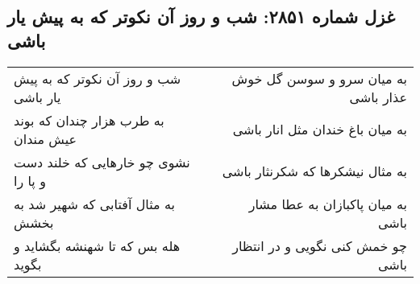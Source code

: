 \begin{center}
\section*{غزل شماره ۲۸۵۱: شب و روز آن نکوتر که به پیش یار باشی}
\label{sec:2851}
\begin{longtable}{l p{0.5cm} r}
شب و روز آن نکوتر که به پیش یار باشی
&&
به میان سرو و سوسن گل خوش عذار باشی
\\
به طرب هزار چندان که بوند عیش مندان
&&
به میان باغ خندان مثل انار باشی
\\
نشوی چو خارهایی که خلند دست و پا را
&&
به مثال نیشکرها که شکرنثار باشی
\\
به مثال آفتابی که شهیر شد به بخشش
&&
به میان پاکبازان به عطا مشار باشی
\\
هله بس که تا شهنشه بگشاید و بگوید
&&
چو خمش کنی نگویی و در انتظار باشی
\\
\end{longtable}
\end{center}
